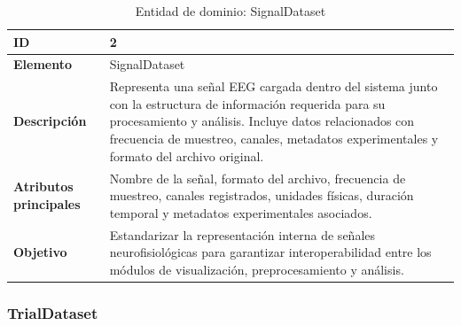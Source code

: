 \documentclass[12pt, letterpaper]{article}
\begin{document}
\begin{table}[H]
\centering

\begin{tabularx}{\textwidth}{|
>{}p{3.9cm}|
Y|
}

\hline
\textbf{ID} & 2 \\ \hline

\textbf{Elemento} & SignalDataset \\ \hline

\textbf{Descripción}
&
Representa una señal EEG cargada dentro del sistema junto con la estructura
de información requerida para su procesamiento y análisis. Incluye datos
relacionados con frecuencia de muestreo, canales, metadatos experimentales
y formato del archivo original.
\\ \hline

\textbf{Atributos principales}
&
Nombre de la señal, formato del archivo, frecuencia de muestreo, canales
registrados, unidades físicas, duración temporal y metadatos
experimentales asociados.
\\ \hline

\textbf{Objetivo}
&
Estandarizar la representación interna de señales neurofisiológicas para
garantizar interoperabilidad entre los módulos de visualización,
preprocesamiento y análisis.
\\ \hline

\end{tabularx}

\caption{Entidad de dominio: SignalDataset}
\label{tab:signaldataset}

\end{table}

\subsubsection{TrialDataset}
\end{document}
